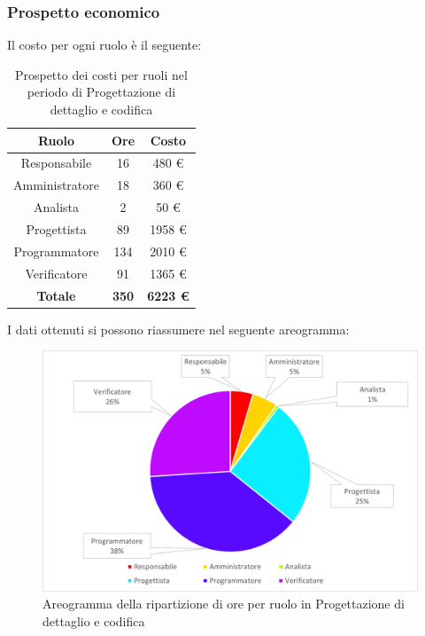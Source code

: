 \subsubsection{Prospetto economico}
Il costo per ogni ruolo è il seguente:
\begin{table}[H]
		\begin{center}
			\setlength{\aboverulesep}{0pt}
			\setlength{\belowrulesep}{0pt}
			\setlength{\extrarowheight}{.75ex}
			\begin{tabular}{ c c c }
				\rowcolor{AzzurroGruppo!30} 
				\textbf{Ruolo} & \textbf{Ore} & \textbf{Costo}  \\
				\toprule
				Responsabile   & 16 & 480 \euro \\
				Amministratore & 18 & 360 \euro \\
				Analista       & 2 & 50 \euro \\
				Progettista    & 89 & 1958 \euro \\
				Programmatore  & 134 & 2010 \euro \\
				Verificatore   & 91 & 1365 \euro \\
				\textbf{Totale} & \textbf{350} & \textbf{6223 \euro} \\
				\bottomrule
			\end{tabular}
			\caption{ Prospetto dei costi per ruoli nel periodo di Progettazione di dettaglio e codifica}
		\end{center}
	\end{table}
I dati ottenuti si possono riassumere nel seguente areogramma:
\begin{figure}[H]
    \centering
    \includegraphics[scale = 0.5]{components/img/Sprint-8-9-torta.png}
    \caption{ Areogramma della ripartizione di ore per ruolo in Progettazione di dettaglio e codifica}
    \label{fig:Areogramma ripartizione ore, fase di Progettazione di dettaglio e codifica}
\end{figure}
